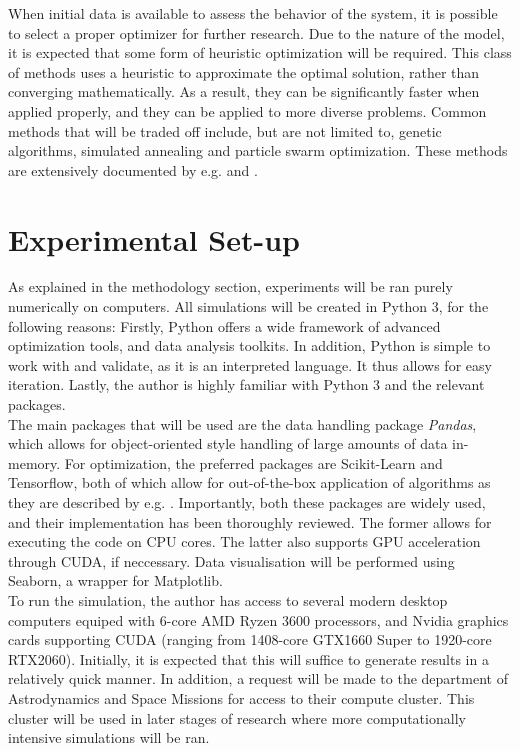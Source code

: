 \documentclass[12pt, english, NoHyper]{AE4010-template}
\begin{document}
When initial data is available to assess the behavior of the system, it is possible to select a proper optimizer for further research. Due to the nature of the model, it is expected that some form of heuristic optimization will be required. This class of methods uses a heuristic to approximate the optimal solution, rather than converging mathematically. As a result, they can be significantly faster when applied properly, and they can be applied to more diverse problems. Common methods that will be traded off include, but are not limited to, genetic algorithms, simulated annealing and particle swarm optimization. These methods are extensively documented by e.g. \cite{DLTwo} and \cite{DLOne}.


\section{Experimental Set-up}
As explained in the methodology section, experiments will be ran purely numerically on computers. All simulations will be created in Python 3, for the following reasons: Firstly, Python offers a wide framework of advanced optimization tools, and data analysis toolkits. In addition, Python is simple to work with and validate, as it is an interpreted language. It thus allows for easy iteration. Lastly, the author is highly familiar with Python 3 and the relevant packages. \\

The main packages that will be used are the data handling package \textit{Pandas}, which allows for object-oriented style handling of large amounts of data in-memory. For optimization, the preferred packages are Scikit-Learn and Tensorflow, both of which allow for out-of-the-box application of algorithms as they are described by e.g. \cite{DLOne}. Importantly, both these packages are widely used, and their implementation has been thoroughly reviewed. The former allows for executing the code on CPU cores. The latter also supports GPU acceleration through CUDA, if neccessary. Data visualisation will be performed using Seaborn, a wrapper for Matplotlib. \\

To run the simulation, the author has access to several modern desktop computers equiped with 6-core AMD Ryzen 3600 processors, and Nvidia graphics cards supporting CUDA (ranging from 1408-core GTX1660 Super to 1920-core RTX2060). Initially, it is expected that this will suffice to generate results in a relatively quick manner. In addition, a request will be made to the department of Astrodynamics and Space Missions for access to their compute cluster. This cluster will be used in later stages of research where more computationally intensive simulations will be ran.
\end{document}
